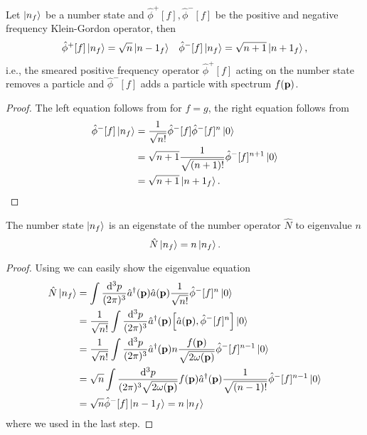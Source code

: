 \begin{lemma}\label{thm:qkg_smeared_pn}
	Let $\ket{n_f}$ be a number state and $\hat\phi^+[f],\hat\phi^-[f]$ be the positive and negative frequency Klein-Gordon operator, then
	\begin{align}
		\hat\phi^+[f]
		\ket{n_f}
		=
		\sqrt{n}
		\ket{n-1_f}
		&&
		\hat\phi^-[f]
		\ket{n_f}
		=
		\sqrt{n+1}
		\ket{n+1_f}
		,
	\end{align}
	i.e., the smeared positive frequency operator $\hat\phi^+[f]$ acting on the number state removes a particle and $\hat\phi^-[f]$ adds a particle with spectrum $f(\vb{p})$.
\end{lemma}
\begin{proof}
	The left equation follows from  for $f=g$, the right equation follows from
	\begin{equation*}
		\begin{split}
			\hat\phi^-[f]
			\ket{n_f}
			&=
			\frac{1}{\sqrt{n!}}
			\hat\phi^-[f]
			\hat\phi^-[f]^n
			\ket{0}
			\\
			&=
			\sqrt{n+1}
			\frac{1}{\sqrt{(n+1)!}}
			\hat\phi^-[f]^{n+1}
			\ket{0}
			\\
			&=
			\sqrt{n+1}
			\ket{n+1_f}
			.
		\end{split}
	\end{equation*}
\end{proof}

\begin{theorem}\label{thm:qkg_number_state_eigenstate}%
	The number state $\ket{n_f}$ is an eigenstate of the number operator $\hat{N}$ to eigenvalue $n$
	\begin{equation}
		\hat{N}
		\ket{n_f}
		=
		n
		\ket{n_f}
		.
	\end{equation}
\end{theorem}
\begin{proof}
	Using  we can easily show the eigenvalue equation
	\begin{equation*}
		\begin{split}
			\hat{N}
			\ket{n_f}
			&=
			\int\frac{\dd[3]{p}}{(2\pi)^3}
			\hat{a}^\dagger(\vb{p})
			\hat{a}(\vb{p})
			\frac{1}{\sqrt{n!}}
			\hat\phi^-[f]^n
			\ket{0}
			\\
			&=
			\frac{1}{\sqrt{n!}}
			\int\frac{\dd[3]{p}}{(2\pi)^3}
			\hat{a}^\dagger(\vb{p})
			\comm{\hat{a}(\vb{p})}{\hat\phi^-[f]^n}
			\ket{0}
			\\
			&=
			\frac{1}{\sqrt{n!}}
			\int\frac{\dd[3]{p}}{(2\pi)^3}
			\hat{a}^\dagger(\vb{p})
			n
			\frac{f(\vb{p})}{\sqrt{2\omega(\vb{p})}}
			\hat\phi^-[f]^{n-1}
			\ket{0}
			\\
			&=
			\sqrt{n}
			\int\frac{\dd[3]{p}}{(2\pi)^3\sqrt{2\omega(\vb{p})}}
				f(\vb{p})
			\hat{a}^\dagger(\vb{p})
			\frac{1}{\sqrt{(n-1)!}}
			\hat\phi^-[f]^{n-1}
			\ket{0}
			\\
			&=
			\sqrt{n}
			\hat\phi^-[f]
			\ket{n-1_f}
			=
			n
			\ket{n_f}
		\end{split}
	\end{equation*}
	where we used  in the last step.
\end{proof}

